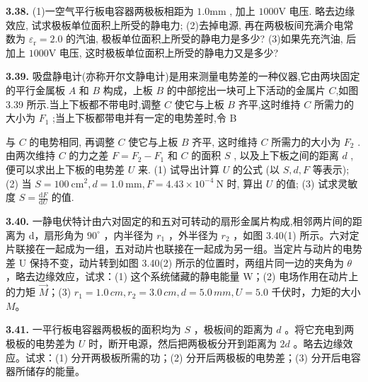 \vfill
\newpage

\textbf{3.38.} (1)一空气平行板电容器两极板相距为 $1.0\mathrm{mm}$ , 加上 $1000\mathrm{V}$ 电压. 略去边缘效应, 试求极板单位面积上所受的静电力; (2)去掉电源, 再在两极板间充满介电常数为 $\varepsilon_{\mathrm{r}} = 2.0$ 的汽油, 极板单位面积上所受的静电力是多少? (3)如果先充汽油, 后加上 $1000\mathrm{V}$ 电压, 这时极板单位面积上所受的静电力又是多少?

\vfill
\newpage

\textbf{3.39.} 吸盘静电计(亦称开尔文静电计)是用来测量电势差的一种仪器,它由两块固定的平行金属板 $A$ 和 $B$ 构成，上板 $B$ 的中部挖出一块可上下活动的金属片 $C$,如图 3.39 所示.当上下板都不带电时,调整 $C$ 使它与上板 $B$ 齐平,这时维持 $C$ 所需力的大小为 $F_{1}$ ;当上下板都带电并有一定的电势差时,令 B

与 $C$ 的电势相同, 再调整 $C$ 使它与上板 $B$ 齐平, 这时维持 $C$ 所需力的大小为 $F_{2}$ . 由两次维持 $C$ 的力之差 $F = F_{2} - F_{1}$ 和 $C$ 的面积 $S$ , 以及上下板之间的距离 $d$ , 便可以求出上下板的电势差 $U$ 来. (1) 试导出计算 $U$ 的公式 (以 $S, d, F$ 等表示); (2) 当 $S = 100 \mathrm{~cm}^{2}, d = 1.0 \mathrm{~mm}, F = 4.43 \times 10^{-4} \mathrm{~N}$ 时, 算出 $U$ 的值; (3) 试求灵敏度 $\displaystyle S = \frac{\mathrm{d} F}{\mathrm{d} U}$ 的值.

\vfill
\newpage

\textbf{3.40.} 一静电伏特计由六对固定的和五对可转动的扇形金属片构成,相邻两片间的距离为 d，扇形角为 $90^{\circ}$ ，内半径为 $r_{1}$ ，外半径为 $r_{2}$ ，如图 3.40(1) 所示。六对定片联接在一起成为一组，五对动片也联接在一起成为另一组。当定片与动片的电势差 U 保持不变，动片转到如图 3.40(2) 所示的位置时，两组片同一边的夹角为 $\theta$ ，略去边缘效应，试求：(1) 这个系统储藏的静电能量 W；(2) 电场作用在动片上的力矩 $\vec{M}$；(3) $r_{1} = 1.0 \, cm, r_{2} = 3.0 \, cm, d = 5.0 \, mm, U = 5.0$ 千伏时，力矩的大小 $M$。

\begin{center}
  \begin{minipage}[b]{0.47\linewidth}
    \centering
  \end{minipage}\hfill
  \begin{minipage}[b]{0.47\linewidth}
    \centering
  \end{minipage}
\end{center}

\vfill
\newpage

\textbf{3.41.} 一平行板电容器两极板的面积均为 $S$ ，极板间的距离为 $d$ 。将它充电到两极板的电势差为 $U$ 时，断开电源，然后把两极板分开到距离为 $2d$ 。略去边缘效应。试求：(1) 分开两极板所需的功；(2) 分开后两极板的电势差；(3) 分开后电容器所储存的能量。

